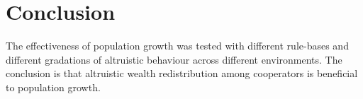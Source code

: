 \documentclass[a4paper,12pt,twocolumn]{article}
\begin{document}

\section{Conclusion}
The effectiveness of population growth was tested with different rule-bases and different gradations of altruistic behaviour across different environments. The conclusion is that altruistic wealth redistribution among cooperators is beneficial to population growth.


\raggedright


\end{document}
